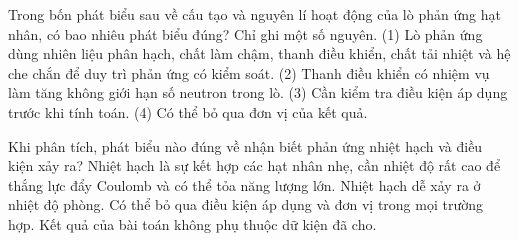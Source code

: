 \begin{ex}
Trong bốn phát biểu sau về cấu tạo và nguyên lí hoạt động của lò phản ứng hạt nhân, có bao nhiêu phát biểu đúng? Chỉ ghi một số nguyên. (1) Lò phản ứng dùng nhiên liệu phân hạch, chất làm chậm, thanh điều khiển, chất tải nhiệt và hệ che chắn để duy trì phản ứng có kiểm soát. (2) Thanh điều khiển có nhiệm vụ làm tăng không giới hạn số neutron trong lò. (3) Cần kiểm tra điều kiện áp dụng trước khi tính toán. (4) Có thể bỏ qua đơn vị của kết quả.
\end{ex}

\begin{ex}
Khi phân tích, phát biểu nào đúng về nhận biết phản ứng nhiệt hạch và điều kiện xảy ra?
\choice
{\True Nhiệt hạch là sự kết hợp các hạt nhân nhẹ, cần nhiệt độ rất cao để thắng lực đẩy Coulomb và có thể tỏa năng lượng lớn.}
{Nhiệt hạch dễ xảy ra ở nhiệt độ phòng.}
{Có thể bỏ qua điều kiện áp dụng và đơn vị trong mọi trường hợp.}
{Kết quả của bài toán không phụ thuộc dữ kiện đã cho.}
\end{ex}

